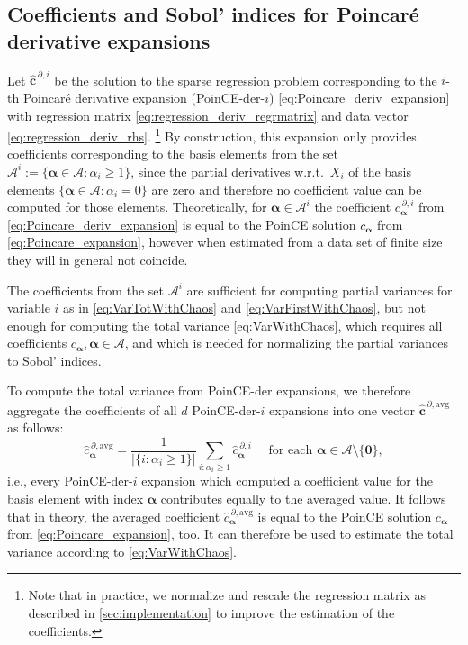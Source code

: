 \documentclass[a4paper,11pt]{article}
\newcommand{\curlyA}{{\mathcal A}}
\newcommand{\ve}[1]{\boldsymbol{#1}}
\newcommand{\alp}{{\ve{\alpha}}}
\theoremstyle{definition}
\theoremstyle{remark}
\theoremstyle{theorem}
\begin{document}
\subsection{Coefficients and Sobol' indices for Poincar\'e derivative expansions}
\label{sec:PDOder_coeffs_sobol}
Let $\hat {\ve c}^{\, \partial, i}$ be the solution to the sparse regression problem corresponding to the $i$-th Poincar\'e derivative expansion (PoinCE-der-$i$) \eqref{eq:Poincare_deriv_expansion} with regression matrix \eqref{eq:regression_deriv_regrmatrix} and data vector \eqref{eq:regression_deriv_rhs}.%
\footnote{Note that in practice, we normalize and rescale the regression matrix as described in \cref{sec:implementation} to improve the estimation of the coefficients.}
By construction, this expansion only provides coefficients corresponding to the basis elements from the set $\curlyA^i := \{\alp \in \curlyA: \alpha_i \geq 1\}$, since the partial derivatives w.r.t.\ $X_i$ of the basis elements $\{\alp \in \curlyA: \alpha_i = 0\}$ are zero and therefore no coefficient value can be computed for those elements.
Theoretically, for $\alp \in \curlyA^i$ the coefficient ${c}_{\alp}^{\, \partial, i}$ from \eqref{eq:Poincare_deriv_expansion} is equal to the PoinCE solution $c_\alp$ from \eqref{eq:Poincare_expansion}, however when estimated from a data set of finite size they will in general not coincide.

The coefficients from the set $\curlyA^i$ are sufficient for computing partial variances for variable $i$ as in \eqref{eq:VarTotWithChaos} and \eqref{eq:VarFirstWithChaos}, 
but not enough for computing the total variance \eqref{eq:VarWithChaos}, which requires all coefficients $c_\alp, \alp \in \curlyA$, and which is needed for normalizing the partial variances to Sobol' indices. 

To compute the total variance from PoinCE-der expansions, we therefore aggregate the coefficients of all $d$ PoinCE-der-$i$ expansions into one vector $\hat{\ve c}^{\, \partial, \text{avg}}$ as follows:
\begin{equation}
\hat{c}_\alp^{\, \partial, \text{avg}} = \frac{1}{\vert\{i:\alpha_i \geq 1\}\vert}\sum_{i: \alpha_i \geq 1} \hat{c}_\alp^{\, \partial, i} \quad \text{ for each } \alp \in \curlyA \setminus \{\ve{0}\},
\end{equation}
i.e., every PoinCE-der-$i$ expansion which computed a coefficient value for the basis element with index $\alp$ contributes equally to the averaged value.
It follows that in theory, the averaged coefficient $\hat {c}_{\alp}^{\, \partial, \text{avg}}$ is equal to the PoinCE solution $c_\alp$ from \eqref{eq:Poincare_expansion}, too.
It can therefore be used to estimate the total variance according to \eqref{eq:VarWithChaos}. 
\end{document}
